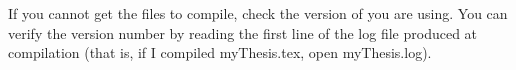 If you cannot get the files to compile, check the version of \Latex
you are using.  You can verify the version number by reading the first
line of the log file produced at compilation (that is, if I compiled
myThesis.tex, open myThesis.log).

